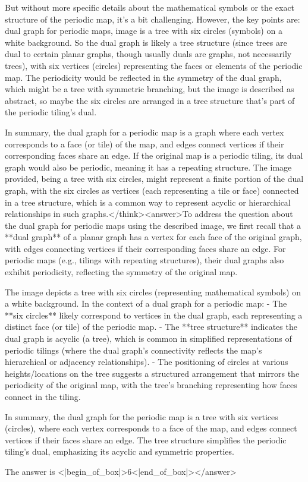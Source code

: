 But without more specific details about the mathematical symbols or the exact structure of the periodic map, it's a bit challenging. However, the key points are: dual graph for periodic maps, image is a tree with six circles (symbols) on a white background. So the dual graph is likely a tree structure (since trees are dual to certain planar graphs, though usually duals are graphs, not necessarily trees), with six vertices (circles) representing the faces or elements of the periodic map. The periodicity would be reflected in the symmetry of the dual graph, which might be a tree with symmetric branching, but the image is described as abstract, so maybe the six circles are arranged in a tree structure that's part of the periodic tiling's dual. 

In summary, the dual graph for a periodic map is a graph where each vertex corresponds to a face (or tile) of the map, and edges connect vertices if their corresponding faces share an edge. If the original map is a periodic tiling, its dual graph would also be periodic, meaning it has a repeating structure. The image provided, being a tree with six circles, might represent a finite portion of the dual graph, with the six circles as vertices (each representing a tile or face) connected in a tree structure, which is a common way to represent acyclic or hierarchical relationships in such graphs.</think><answer>To address the question about the dual graph for periodic maps using the described image, we first recall that a **dual graph** of a planar graph has a vertex for each face of the original graph, with edges connecting vertices if their corresponding faces share an edge. For periodic maps (e.g., tilings with repeating structures), their dual graphs also exhibit periodicity, reflecting the symmetry of the original map.  

The image depicts a tree with six circles (representing mathematical symbols) on a white background. In the context of a dual graph for a periodic map:  
- The **six circles** likely correspond to vertices in the dual graph, each representing a distinct face (or tile) of the periodic map.  
- The **tree structure** indicates the dual graph is acyclic (a tree), which is common in simplified representations of periodic tilings (where the dual graph’s connectivity reflects the map’s hierarchical or adjacency relationships).  
- The positioning of circles at various heights/locations on the tree suggests a structured arrangement that mirrors the periodicity of the original map, with the tree’s branching representing how faces connect in the tiling.  

In summary, the dual graph for the periodic map is a tree with six vertices (circles), where each vertex corresponds to a face of the map, and edges connect vertices if their faces share an edge. The tree structure simplifies the periodic tiling’s dual, emphasizing its acyclic and symmetric properties.  

The answer is <|begin_of_box|>6<|end_of_box|></answer>